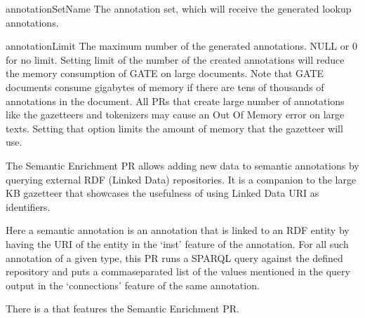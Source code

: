 \begin{plist}

\item{} annotationSetName  The annotation set, which will receive
the generated lookup annotations.

\item{} annotationLimit  The maximum number of the generated
annotations. NULL or 0 for no limit. Setting limit of the number of the
created annotations will reduce the memory consumption of GATE on large
documents. Note that GATE documents consume gigabytes of memory if there are
tens of thousands of annotations in the document. All PRs that create large
number of annotations like the gazetteers and tokenizers may cause an Out Of
Memory error on large texts. Setting that option limits the amount of memory
that the gazetteer will use.

\end{plist}


The Semantic Enrichment PR allows adding new data to semantic annotations by
querying external RDF (Linked Data) repositories. It is a companion to the
large KB gazetteer that showcases the usefulness of using Linked Data URI as
identifiers.

Here a semantic annotation is an annotation that is linked to an RDF entity by
having the URI of the entity in the `inst' feature of the annotation. For all
such annotation of a given type, this PR runs a SPARQL query against the
defined repository and puts a commaseparated list of the values
mentioned in the query output in the `connections' feature of the same
annotation.

There is a  that features the Semantic Enrichment PR.


